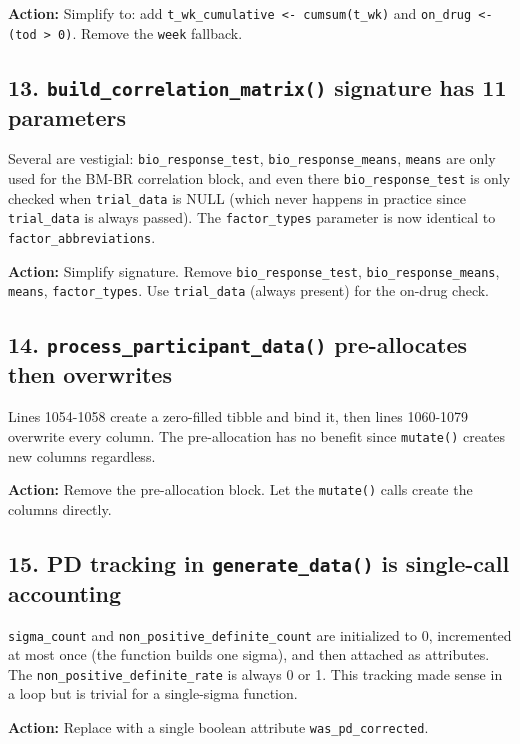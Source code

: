 \documentclass[11pt]{article}
\begin{document}
\textbf{Action:} Simplify to: add \texttt{t\_wk\_cumulative <- cumsum(t\_wk)} and
\texttt{on\_drug <- (tod > 0)}. Remove the \texttt{week} fallback.

\subsection{13. \texttt{build\_correlation\_matrix()} signature has 11 parameters}

Several are vestigial: \texttt{bio\_response\_test}, \texttt{bio\_response\_means},
\texttt{means} are only used for the BM-BR correlation block, and even
there \texttt{bio\_response\_test} is only checked when \texttt{trial\_data} is
NULL (which never happens in practice since \texttt{trial\_data} is always
passed). The \texttt{factor\_types} parameter is now identical to
\texttt{factor\_abbreviations}.

\textbf{Action:} Simplify signature. Remove \texttt{bio\_response\_test},
\texttt{bio\_response\_means}, \texttt{means}, \texttt{factor\_types}. Use \texttt{trial\_data}
(always present) for the on-drug check.

\subsection{14. \texttt{process\_participant\_data()} pre-allocates then overwrites}

Lines 1054-1058 create a zero-filled tibble and bind it, then
lines 1060-1079 overwrite every column. The pre-allocation has no
benefit since \texttt{mutate()} creates new columns regardless.

\textbf{Action:} Remove the pre-allocation block. Let the \texttt{mutate()}
calls create the columns directly.

\subsection{15. PD tracking in \texttt{generate\_data()} is single-call accounting}

\texttt{sigma\_count} and \texttt{non\_positive\_definite\_count} are initialized to
0, incremented at most once (the function builds one sigma), and
then attached as attributes. The \texttt{non\_positive\_definite\_rate} is
always 0 or 1. This tracking made sense in a loop but is trivial
for a single-sigma function.

\textbf{Action:} Replace with a single boolean attribute
\texttt{was\_pd\_corrected}.
\end{document}

